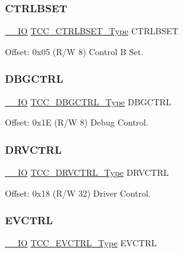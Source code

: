 \subsubsection{\texorpdfstring{CTRLBSET}{CTRLBSET}}
{\footnotesize\ttfamily \mbox{\hyperlink{core__cm0plus_8h_aec43007d9998a0a0e01faede4133d6be}{\+\_\+\+\_\+\+IO}} \mbox{\hyperlink{union_t_c_c___c_t_r_l_b_s_e_t___type}{T\+C\+C\+\_\+\+C\+T\+R\+L\+B\+S\+E\+T\+\_\+\+Type}} C\+T\+R\+L\+B\+S\+ET}



Offset\+: 0x05 (R/W 8) Control B Set. 

\mbox{\label{struct_tcc_a721809f2f5c39fde4b2a969ed30b1bf8}} 
\subsubsection{\texorpdfstring{DBGCTRL}{DBGCTRL}}
{\footnotesize\ttfamily \mbox{\hyperlink{core__cm0plus_8h_aec43007d9998a0a0e01faede4133d6be}{\+\_\+\+\_\+\+IO}} \mbox{\hyperlink{union_t_c_c___d_b_g_c_t_r_l___type}{T\+C\+C\+\_\+\+D\+B\+G\+C\+T\+R\+L\+\_\+\+Type}} D\+B\+G\+C\+T\+RL}



Offset\+: 0x1E (R/W 8) Debug Control. 

\mbox{\label{struct_tcc_a1e68869c006eabb53d7259494b255c4d}} 
\subsubsection{\texorpdfstring{DRVCTRL}{DRVCTRL}}
{\footnotesize\ttfamily \mbox{\hyperlink{core__cm0plus_8h_aec43007d9998a0a0e01faede4133d6be}{\+\_\+\+\_\+\+IO}} \mbox{\hyperlink{union_t_c_c___d_r_v_c_t_r_l___type}{T\+C\+C\+\_\+\+D\+R\+V\+C\+T\+R\+L\+\_\+\+Type}} D\+R\+V\+C\+T\+RL}



Offset\+: 0x18 (R/W 32) Driver Control. 

\mbox{\label{struct_tcc_a5840e5fa650180136e44fe3a96c6dbec}} 
\subsubsection{\texorpdfstring{EVCTRL}{EVCTRL}}
{\footnotesize\ttfamily \mbox{\hyperlink{core__cm0plus_8h_aec43007d9998a0a0e01faede4133d6be}{\+\_\+\+\_\+\+IO}} \mbox{\hyperlink{union_t_c_c___e_v_c_t_r_l___type}{T\+C\+C\+\_\+\+E\+V\+C\+T\+R\+L\+\_\+\+Type}} E\+V\+C\+T\+RL}



